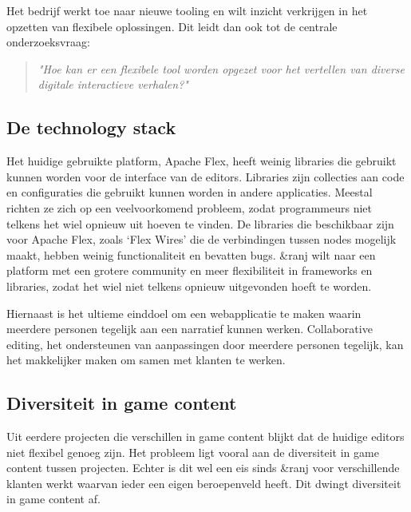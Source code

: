 Het bedrijf werkt toe naar nieuwe tooling en wilt inzicht verkrijgen in het opzetten van flexibele oplossingen. Dit leidt dan ook tot de centrale onderzoeksvraag: 

\begin{quote} 
    \centering
    \large
    \textit{
        "Hoe kan er een flexibele tool worden opgezet voor het vertellen van diverse digitale interactieve verhalen?"
    }
\end{quote}

\subsection{De technology stack}
Het huidige gebruikte platform, Apache Flex, heeft weinig libraries die gebruikt kunnen worden voor de interface van de editors. Libraries zijn collecties aan code en configuraties die gebruikt kunnen worden in andere applicaties. Meestal richten ze zich op een veelvoorkomend probleem, zodat programmeurs niet telkens het wiel opnieuw uit hoeven te vinden. De libraries die beschikbaar zijn voor Apache Flex, zoals ‘Flex Wires’ die de verbindingen tussen nodes mogelijk maakt, hebben weinig functionaliteit en bevatten bugs. \&ranj wilt naar een platform met een grotere community en meer flexibiliteit in frameworks en libraries, zodat het wiel niet telkens opnieuw uitgevonden hoeft te worden.

Hiernaast is het ultieme einddoel om een webapplicatie te maken waarin meerdere personen tegelijk aan een narratief kunnen werken. Collaborative editing, het ondersteunen van aanpassingen door meerdere personen tegelijk, kan het makkelijker maken om samen met klanten te werken.

\subsection{Diversiteit in game content}
Uit eerdere projecten die verschillen in game content blijkt dat de huidige editors niet flexibel genoeg zijn. Het probleem ligt vooral aan de diversiteit in game content tussen projecten. Echter is dit wel een eis sinds \&ranj voor verschillende klanten werkt waarvan ieder een eigen beroepenveld heeft. Dit dwingt diversiteit in game content af.


